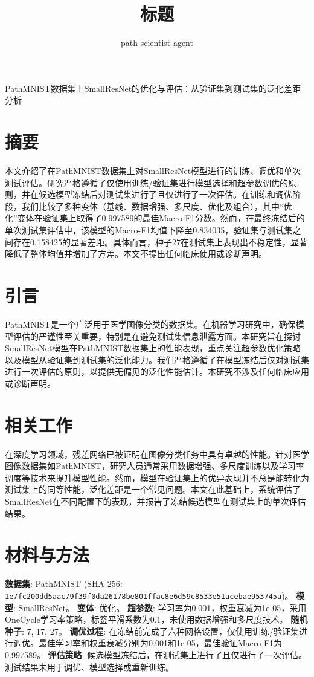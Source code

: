 \documentclass[10pt]{article}
\title{标题}
\author{path-scientist-agent}
\date{}
\begin{document}
\maketitle

PathMNIST数据集上SmallResNet的优化与评估：从验证集到测试集的泛化差距分析
\section{摘要}
本文介绍了在PathMNIST数据集上对SmallResNet模型进行的训练、调优和单次测试评估。研究严格遵循了仅使用训练/验证集进行模型选择和超参数调优的原则，并在候选模型冻结后对测试集进行了且仅进行了一次评估。在训练和调优阶段，我们比较了多种变体（基线、数据增强、多尺度、优化及组合），其中“优化”变体在验证集上取得了0.997589的最佳Macro-F1分数。然而，在最终冻结后的单次测试集评估中，该模型的Macro-F1均值下降至0.834035，验证集与测试集之间存在0.158425的显著差距。具体而言，种子27在测试集上表现出不稳定性，显著降低了整体均值并增加了方差。本文不提出任何临床使用或诊断声明。
\section{引言}
PathMNIST是一个广泛用于医学图像分类的数据集。在机器学习研究中，确保模型评估的严谨性至关重要，特别是在避免测试集信息泄露方面。本研究旨在探讨SmallResNet模型在PathMNIST数据集上的性能表现，重点关注超参数优化策略以及模型从验证集到测试集的泛化能力。我们严格遵循了在模型冻结后仅对测试集进行一次评估的原则，以提供无偏见的泛化性能估计。本研究不涉及任何临床应用或诊断声明。
\section{相关工作}
在深度学习领域，残差网络已被证明在图像分类任务中具有卓越的性能。针对医学图像数据集如PathMNIST，研究人员通常采用数据增强、多尺度训练以及学习率调度等技术来提升模型性能。然而，模型在验证集上的优异表现并不总是能转化为测试集上的同等性能，泛化差距是一个常见问题。本文在此基础上，系统评估了SmallResNet在不同配置下的表现，并报告了冻结候选模型在测试集上的单次评估结果。
\section{材料与方法}
\textbf{数据集}: PathMNIST (SHA-256: \texttt{1e7fc200dd5aac79f39f0da26178be801ffac8e6d59c8533e51acebae953745a})。
\textbf{模型}: SmallResNet。
\textbf{变体}: 优化。
\textbf{超参数}: 学习率为0.001，权重衰减为1e-05，采用OneCycle学习率策略，标签平滑系数为0.1，未使用数据增强和多尺度技术。
\textbf{随机种子}: 7, 17, 27。
\textbf{调优过程}: 在冻结前完成了六种网格设置，仅使用训练/验证集进行调优。最佳学习率和权重衰减分别为0.001和1e-05，最佳验证Macro-F1为0.997589。
\textbf{评估策略}: 候选模型冻结后，在测试集上进行了且仅进行了一次评估。测试结果未用于调优、模型选择或重新训练。
\end{document}
